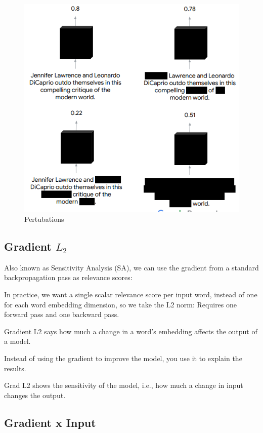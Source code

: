 \documentclass[
  11pt,
  british,
]{article}
\begin{document}
\begin{figure}
\centering
\includegraphics{Pasted_image_20220606165320.png}
\caption{Pertubations}
\end{figure}

\hypertarget{gradient-l_2}{%
\subsection{\texorpdfstring{Gradient
\(L_2\)}{Gradient L\_2}}\label{gradient-l_2}}

Also known as Sensitivity Analysis (SA), we can use the gradient from a
standard backpropagation pass as relevance scores:

In practice, we want a single scalar relevance score per input word,
instead of one for each word embedding dimension, so we take the L2
norm: Requires one forward pass and one backward pass.

Gradient L2 says how much a change in a word's embedding affects the
output of a model.

Instead of using the gradient to improve the model, you use it to
explain the results.

Grad L2 shows the sensitivity of the model, i.e., how much a change in
input changes the output.

\hypertarget{gradient-x-input}{%
\subsection{Gradient x Input}\label{gradient-x-input}}
\end{document}
